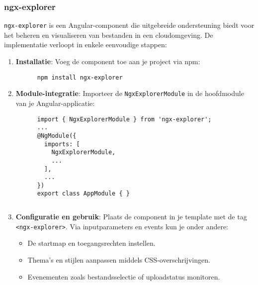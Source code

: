\subsubsection{ngx-explorer}
\texttt{ngx-explorer} is een Angular-component die uitgebreide ondersteuning biedt voor het beheren en visualiseren van bestanden in een cloudomgeving. De implementatie verloopt in enkele eenvoudige stappen:
\begin{enumerate}
  \item \textbf{Installatie}: Voeg de component toe aan je project via npm:

  \begin{listing}
    \begin{verbatim}
      npm install ngx-explorer
    \end{verbatim}
  \end{listing}

  \item \textbf{Module-integratie}: Importeer de \texttt{NgxExplorerModule} in de hoofdmodule van je Angular-applicatie:
  
  \begin{listing}
    \begin{verbatim}
      import { NgxExplorerModule } from 'ngx-explorer';
      ...
      @NgModule({
        imports: [
          NgxExplorerModule,
          ...
        ],
        ...
      })
      export class AppModule { }
    \end{verbatim}
  \end{listing}

  \begin{verbatim}

  \end{verbatim}
  \item \textbf{Configuratie en gebruik}: Plaats de component in je template met de tag \texttt{<ngx-explorer>}. Via inputparameters en events kun je onder andere:
  \begin{itemize}
    \item De startmap en toegangsrechten instellen.
    \item Thema’s en stijlen aanpassen middels CSS-overschrijvingen.
    \item Evenementen zoals bestandsselectie of uploadstatus monitoren.
  \end{itemize}
\end{enumerate}

